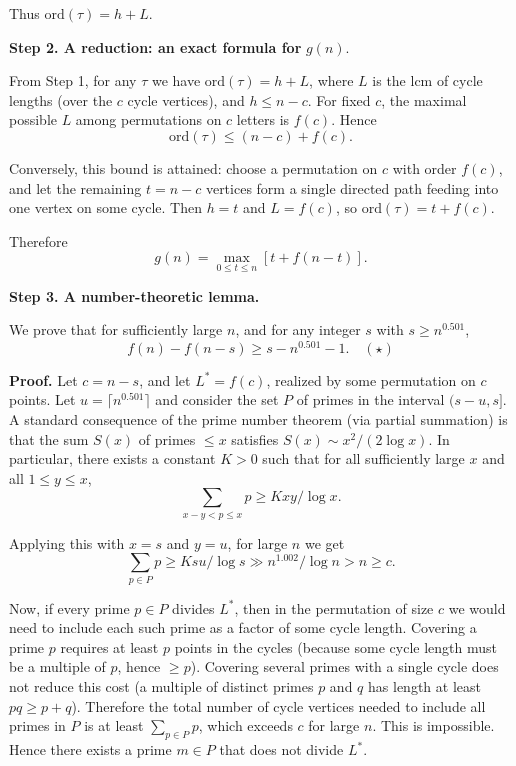 \documentclass[12pt,a4paper]{article}
\theoremstyle{definition}
\begin{document}
    Thus $\mathrm{ord}(\tau) = h + L$.

    \textbf{Step 2. A reduction: an exact formula for} $g(n)$.

    From Step 1, for any $\tau$ we have $\mathrm{ord}(\tau) = h + L$, where $L$ is the lcm of cycle lengths (over the $c$ cycle vertices), and $h \leq n - c$. For fixed $c$, the maximal possible $L$ among permutations on $c$ letters is $f(c)$. Hence
    $$\mathrm{ord}(\tau) \leq (n - c) + f(c).$$

    Conversely, this bound is attained: choose a permutation on $c$ with order $f(c)$, and let the remaining $t = n - c$ vertices form a single directed path feeding into one vertex on some cycle. Then $h = t$ and $L = f(c)$, so $\mathrm{ord}(\tau) = t + f(c)$.

    Therefore
    $$g(n) = \max_{0 \leq t \leq n} [t + f(n - t)].$$

    \textbf{Step 3. A number-theoretic lemma.}

    We prove that for sufficiently large $n$, and for any integer $s$ with $s \geq n^{0.501}$,
    $$f(n) - f(n - s) \geq s - n^{0.501} - 1. \quad (\star)$$

    \textbf{Proof.} Let $c = n - s$, and let $L^* = f(c)$, realized by some permutation on $c$ points. Let $u = \lceil n^{0.501} \rceil$ and consider the set $P$ of primes in the interval $(s - u, s]$. A standard consequence of the prime number theorem (via partial summation) is that the sum $S(x)$ of primes $\leq x$ satisfies $S(x) \sim x^2/(2 \log x)$. In particular, there exists a constant $K > 0$ such that for all sufficiently large $x$ and all $1 \leq y \leq x$,
    $$\sum_{x-y < p \leq x} p \geq K x y / \log x.$$

    Applying this with $x = s$ and $y = u$, for large $n$ we get
    $$\sum_{p \in P} p \geq K s u / \log s \gg n^{1.002}/\log n > n \geq c.$$

    Now, if every prime $p \in P$ divides $L^*$, then in the permutation of size $c$ we would need to include each such prime as a factor of some cycle length. Covering a prime $p$ requires at least $p$ points in the cycles (because some cycle length must be a multiple of $p$, hence $\geq p$). Covering several primes with a single cycle does not reduce this cost (a multiple of distinct primes $p$ and $q$ has length at least $pq \geq p + q$). Therefore the total number of cycle vertices needed to include all primes in $P$ is at least $\sum_{p \in P} p$, which exceeds $c$ for large $n$. This is impossible. Hence there exists a prime $m \in P$ that does not divide $L^*$.
\end{document}
